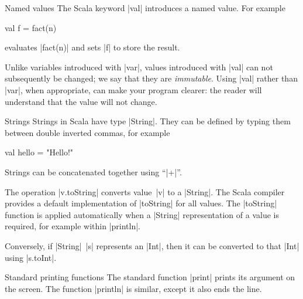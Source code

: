 
\begin{scalaBox}{Named values}
\label{sb:val}
The Scala keyword |val| introduces a named value.  For example
\begin{scala}
  val f = fact(n)
\end{scala}
evaluates |fact(n)| and sets |f| to store the result.

Unlike variables introduced with |var|, values introduced with |val| can not
subsequently be changed; we say that they are \emph{immutable}.  Using |val|
rather than |var|, when appropriate, can make your program clearer: the reader
will understand that the value will not change.
\end{scalaBox}


\begin{scalaBox}{Strings}
\label{sb:strings}
Strings in Scala have type |String|.  They can  be defined by typing them
between double inverted commas, for example
\begin{scala}
  val hello = "Hello!"
\end{scala}

Strings can be concatenated together using ``|+|''. 

The operation |v.toString| converts value~|v| to a |String|.  The Scala compiler
provides a default implementation of |toString| for all values.  The
|toString| function is applied automatically when a |String| representation of
a value is required, for example within |println|.

Conversely, if |String|~|s| represents an |Int|, then it can be converted to
that |Int| using |s.toInt|.
\end{scalaBox}


\begin{scalaBox}{Standard printing functions}
\label{sb:print}
The standard function |print| prints its argument on the screen.
The function |println| is similar, except it also ends the line.
\end{scalaBox}

